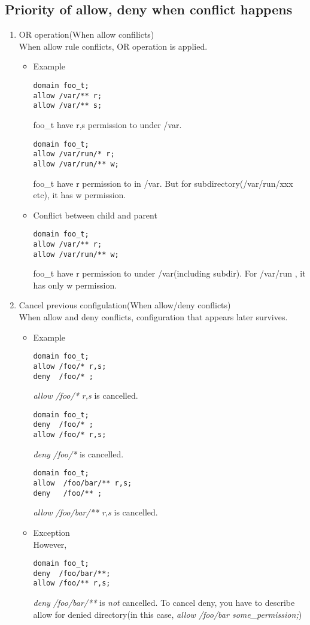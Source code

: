 \documentclass{article}
\begin{document}
\subsection{Priority of allow, deny when conflict happens}
 \begin{enumerate}
  \item OR operation(When allow confilicts) \\
	When allow rule conflicts, 
	OR operation is applied.\\
	\begin{itemize}
	 \item Example
	       \begin{verbatim}
domain foo_t;
allow /var/** r;
allow /var/** s;
	       \end{verbatim}
foo\_t have r,s permission to under /var.
	       \begin{verbatim}
domain foo_t;
allow /var/run/* r;
allow /var/run/** w;
	       \end{verbatim}
foo\_t have r permission to in /var.
But for subdirectory(/var/run/xxx etc), it has w permission.

  \item Conflict between child and parent
	       \begin{verbatim}
domain foo_t;
allow /var/** r;
allow /var/run/** w;
	       \end{verbatim}

foo\_t have r permission to under /var(including subdir).
For /var/run , it has only w permission.
	\end{itemize}

  \item Cancel previous configulation(When allow/deny conflicts)\\
	When allow and deny conflicts, 
configuration that appears later survives.
       \begin{itemize}
	  \item Example
		\begin{verbatim}
domain foo_t;
allow /foo/* r,s;
deny  /foo/* ;
		\end{verbatim}
		{\it allow /foo/* r,s} is cancelled.
		\begin{verbatim}
domain foo_t;
deny  /foo/* ;
allow /foo/* r,s;
		\end{verbatim}
		{\it deny /foo/* } is cancelled.

		\begin{verbatim}
domain foo_t;
allow  /foo/bar/** r,s;
deny   /foo/** ;
		\end{verbatim}
		{\it allow /foo/bar/** r,s} is cancelled.

	\item Exception\\
		However,		
		\begin{verbatim}
domain foo_t;
deny  /foo/bar/**;
allow /foo/** r,s;
		\end{verbatim}
		{\it deny /foo/bar/**}  is {\it not} cancelled. To
		cancel deny, you have to describe allow for denied
		directory(in this case, {\it allow /foo/bar some\_permission;})
       \end{itemize}
 \end{enumerate}
\end{document}
